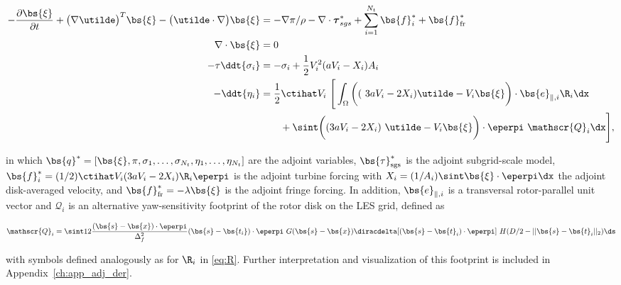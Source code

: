 	{\small
	\begin{align}
	- \frac{\partial \bs{\xi}}{\partial t} + \big( \nabla \utilde \big)^T \bs{\xi} - \big( \utilde \cdot \nabla \big) \bs{\xi} &= - \nabla \pi / \rho - \nabla \cdot \boldsymbol{\tau}^*_{sgs}  + \sum_{i=1}^{N_t} \bs{f}_i^* + \bs{f}_{\text{fr}}^* \label{eq:adjoint_momentum}\\
	\nabla \cdot \bs{\xi} &= 0 \label{eq:adjoint_continuity}\\
	-\tau \ddt{\sigma_i} &= -\sigma_i + \frac{1}{2} V_i^2  (a V_i - X_i) A_i \label{eq:adjoint_sigma}\\
	- \ddt{\eta_i} &= \frac{1}{2} \ctihat V_i ~ \Bigg[ \int_{\Omega} \bigg((~3aV_i - 2 X_i ) \utilde - V_i \bs{\xi} 
	\bigg) \cdot \bs{e}_{\parallel,i} \R_i \dx \nonumber \\
	& \qquad  + \sint \bigg( (3a V_i - 2 X_i )~\utilde - V_i \bs{\xi} \bigg) \cdot \eperpi ~ \mathscr{Q}_i  \dx \Bigg] \label{eq:adjoint_eta},
	\end{align}
}

	in which $\bs{q}^* = [\bs{\xi}, \pi, \sigma_1, \dots, \sigma_{N_t}, \eta_1, \dots, \eta_{N_t}]$ are the adjoint variables, $\bs{\tau}_{\text{sgs}}^*$ is the adjoint subgrid-scale model, $\bs{f}_i^* = (1/2)\ctihat V_i (3a V_i - 2 X_i ) \R_i \eperpi$ is the adjoint turbine forcing with $X_i = (1/A_i)\sint \bs{\xi} \cdot \eperpi \dx$ the adjoint disk-averaged velocity, and $\bs{f}_{\text{fr}}^* = -\lambda \bs{\xi}$ is the adjoint fringe forcing. In addition, $\bs{e}_{\parallel,i}$ is a transversal rotor-parallel unit vector and $\mathscr{Q}_i$ is an alternative yaw-sensitivity footprint of the rotor disk on the LES grid, defined as 
	
	{\small
	\begin{equation}
		\mathscr{Q}_i = \sint 12 \frac{(\bs{s}-\bs{x})\cdot \eperpi}{\Delta_f^2} (\bs{s} - \bs{t_i})\cdot \eperpi \ G(\bs{s} - \bs{x}) \diracdelta [(\bs{s}-\bs{t}_i)\cdot\eperpi] ~ H(D/2-\vert\vert \bs{s}-\bs{t}_i\vert\vert_2) \ds
	\end{equation}
	}
	
	with symbols defined analogously as for $\R_i$ in \eqref{eq:R}. Further interpretation and visualization of this footprint is included in Appendix~\ref{ch:app_adj_der}. 
		
